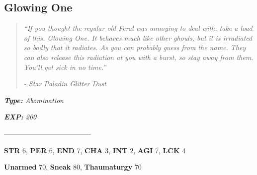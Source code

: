 \documentclass[11pt,a4paper,twocolumn]{book}
\begin{document}
	\subsection*{Glowing One}
	\begin{quote}
		\emph{``If you thought the regular old Feral was annoying to deal with, take a load of this. Glowing One. It behaves much like other ghouls, but it is irradiated so badly that it radiates. As you can probably guess from the name. They can also release this radiation at you with a burst, so stay away from them. You'll get sick in no time.''}
		
		\emph{-	Star Paladin Glitter Dust}
	\end{quote}
	
	\noindent
	\emph{\textbf{Type:} Abomination}
	
	\noindent
	\emph{\textbf{EXP:} 200}
	
%		
%	
%		

	--------------------------------------
	
	\noindent
	\textbf{STR} 6, \textbf{PER} 6, \textbf{END} 7, \textbf{CHA} 3, \textbf{INT} 2, \textbf{AGI} 7, \textbf{LCK} 4
	
	\noindent
	\textbf{Unarmed} 70, \textbf{Sneak} 80, \textbf{Thaumaturgy} 70
	
\end{document}
